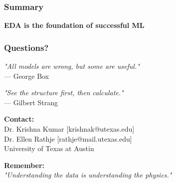 \documentclass[notes]{beamer}
\begin{document}
\begin{frame}
\frametitle{Summary}

\textbf{EDA is the foundation of successful ML}

\vspace{1em}


\end{frame}

\begin{frame}
\frametitle{Questions?}

\centering


	\large
	
	\textit{"All models are wrong, but some are useful."} \\
	\vspace{0.3em}
	--- George Box
	
	\vspace{2em}
	
	\textit{"See the structure first, then calculate."} \\
	\vspace{0.3em}
	--- Gilbert Strang

\vspace{2em}
\normalsize
\textbf{Contact:} \\
Dr. Krishna Kumar [krishnak@utexas.edu]\\
Dr. Ellen Rathje [rathje@mail.utexas.edu]\\
University of Texas at Austin

\vspace{1cm}

\textbf{Remember:} \\
\textit{"Understanding the data is understanding the physics."}

\end{frame}
\end{document}
